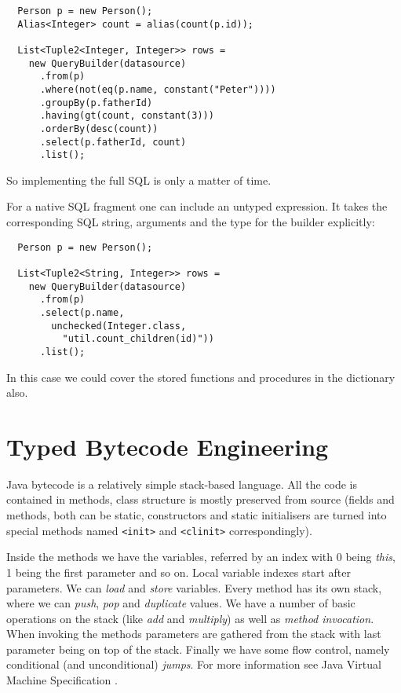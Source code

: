 \documentclass{sig-alternate}
\begin{document}
\begin{verbatim}
  Person p = new Person();
  Alias<Integer> count = alias(count(p.id));

  List<Tuple2<Integer, Integer>> rows =
    new QueryBuilder(datasource)
      .from(p)
      .where(not(eq(p.name, constant("Peter"))))
      .groupBy(p.fatherId)
      .having(gt(count, constant(3)))
      .orderBy(desc(count))
      .select(p.fatherId, count)
      .list();
\end{verbatim}

So implementing the full SQL is only a matter of time.

For a native SQL fragment one can include an untyped expression.
It takes the corresponding SQL string, arguments and the type for the builder
explicitly:

\begin{verbatim}
  Person p = new Person();

  List<Tuple2<String, Integer>> rows =
    new QueryBuilder(datasource)
      .from(p)
      .select(p.name,
        unchecked(Integer.class,
          "util.count_children(id)"))
      .list();
\end{verbatim}

In this case we could cover the stored functions and procedures in the dictionary also.

\section{Typed Bytecode Engineering}

Java bytecode is a relatively simple stack-based language. All the code is contained in methods, class structure is mostly preserved from source (fields and methods, both can be static, constructors and static initialisers are turned into special methods named \verb!<init>! and \verb!<clinit>! correspondingly). 

Inside the methods we have the variables, referred by an index with $0$ being \emph{this}, 1 being the first parameter and so on. Local variable indexes start after parameters. We can \emph{load} and \emph{store} variables. Every method has its own  stack, where we can \emph{push}, \emph{pop} and \emph{duplicate} values. We have a number of basic operations on the stack (like \emph{add} and \emph{multiply}) as well as \emph{method invocation}. When invoking the methods parameters are gathered from the stack with last parameter being on top of the stack. Finally we have some flow control, namely conditional (and unconditional) \emph{jumps}. For more information see Java Virtual Machine Specification \cite{lindholm1999jvm}.
\end{document}

